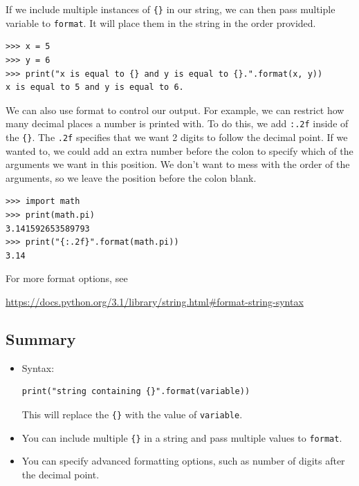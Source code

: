 \documentclass[11pt,hidelinks]{article}
\begin{document}
If we include multiple instances of \lstinline!{}! in our string, we can then pass multiple variable to \lstinline{format}. It will place them in the string in the order provided.

\begin{lstlisting}[style=ipython]
>>> x = 5
>>> y = 6
>>> print("x is equal to {} and y is equal to {}.".format(x, y))
x is equal to 5 and y is equal to 6.
\end{lstlisting}

We can also use format to control our output. For example, we can restrict how many decimal places a number is printed with. To do this, we add \lstinline{:.2f} inside of the \lstinline!{}!. The \lstinline{.2f} specifies that we want 2 digits to follow the decimal point. If we wanted to, we could add an extra number before the colon to specify which of the arguments we want in this position. We don't want to mess with the order of the arguments, so we leave the position before the colon blank.

\begin{lstlisting}[style=ipython]
>>> import math
>>> print(math.pi)
3.141592653589793
>>> print("{:.2f}".format(math.pi))
3.14
\end{lstlisting}

For more format options, see
\begin{center}
  \vspace{-2mm}
\url{https://docs.python.org/3.1/library/string.html#format-string-syntax}
\vspace{-2mm}

\end{center}

\subsection{Summary}

\begin{itemize}
  \item Syntax:
    \begin{lstlisting}
print("string containing {}".format(variable))
    \end{lstlisting}
    
    This will replace the \lstinline!{}! with the value of \lstinline{variable}.
    
  \item You can include multiple \lstinline!{}! in a string and pass multiple values to \lstinline{format}.

  \item You can specify advanced formatting options, such as number of digits after the decimal point.
\end{itemize}
\end{document}
